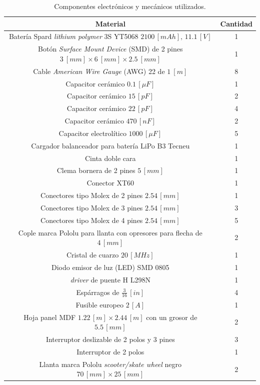 \documentclass{article}
\begin{document}
\begin{table}[H]
\centering
\caption{Componentes electrónicos y mecánicos utilizados.}
\begin{tabular}{|c|c|}\hline
    \rowcolor{gray!30}
\textbf{Material} & \textbf{Cantidad} \\ \hline
Batería Spard \textit{lithium polymer} 3S YT5068 $2100\,[mAh],\,11.1\,[V]$ & 1\\ \hline
Botón \textit{Surface Mount Device} (SMD) de 2 pines $3\:[mm]\times6\:[mm]\times2.5\:[mm]$ & 1\\ \hline
Cable \textit{American Wire Gauge} (AWG) 22 de $1\:[m]$ & 8\\ \hline
Capacitor cerámico $0.1\,[\mu F]$ & 1\\ \hline
Capacitor cerámico $15\,[pF]$ & 2\\ \hline
Capacitor cerámico $22\,[pF]$ & 4\\ \hline
Capacitor cerámico $470\,[nF]$ & 2\\ \hline
Capacitor electrolítico $1000\,[\mu F]$ & 5\\ \hline
Cargador balanceador para batería LiPo B3 Tecneu & 1\\ \hline
Cinta doble cara & 1\\ \hline
Clema bornera de 2 pines $5\,[mm]$ & 1\\ \hline
Conector XT60 & 1\\ \hline
Conectores tipo Molex de 2 pines $2.54\,[mm]$ & 1\\ \hline
Conectores tipo Molex de 3 pines $2.54\,[mm]$ & 3\\ \hline
Conectores tipo Molex de 4 pines $2.54\,[mm]$ & 5\\ \hline
Cople marca Pololu para llanta con opresores para flecha de $4\,[mm]$ & 2\\ \hline
Cristal de cuarzo $20\,[MHz]$ & 1\\ \hline
Diodo emisor de luz (LED) SMD 0805 & 1\\ \hline
\textit{driver} de puente H L298N & 1\\ \hline
Espárragos de $\frac{3}{16}\,[in]$ & 4\\ \hline
Fusible europeo $2\,[A]$ & 1\\ \hline
Hoja panel MDF $1.22\,[m]\times2.44\,[m]$ con un grosor de $5.5\,[mm]$ & 2\\ \hline
Interruptor deslizable de 2 polos y 3 pines & 3\\ \hline
Interruptor de 2 polos & 1\\ \hline
Llanta marca Pololu \textit{scooter/skate wheel} negro $70\,[mm]\times25\,[mm]$ & 2\\ \hline

\end{tabular}
\end{table}
\end{document}
